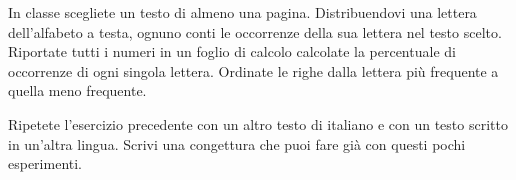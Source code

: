 \begin{esercizio}
In classe scegliete un testo di almeno una pagina. Distribuendovi una
lettera dell'alfabeto a testa, ognuno conti le occorrenze della sua
lettera nel testo scelto. Riportate tutti i numeri in un foglio di calcolo
calcolate la percentuale di occorrenze di ogni singola lettera.
Ordinate le righe dalla lettera più frequente a quella meno frequente.
\end{esercizio}

\begin{esercizio}
Ripetete l'esercizio precedente con un altro testo di italiano e con un
testo scritto in un'altra lingua. Scrivi una congettura che puoi fare
già con questi pochi esperimenti.
\end{esercizio}
